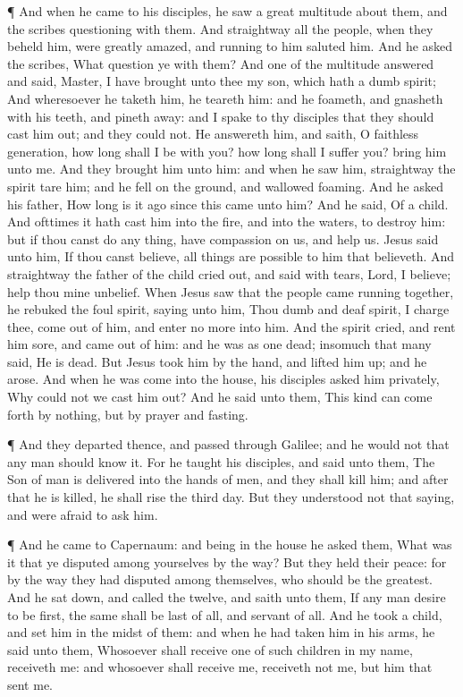  ¶ And when he came to his disciples, he saw a great
multitude about them, and the scribes questioning with them.
 And straightway all the people, when they beheld him, were
greatly amazed, and running to him saluted him.  And he
asked the scribes, What question ye with them?  And one of
the multitude answered and said, Master, I have brought unto thee my
son, which hath a dumb spirit;  And wheresoever he taketh
him, he teareth him: and he foameth, and gnasheth with his teeth, and
pineth away: and I spake to thy disciples that they should cast him out;
and they could not.  He answereth him, and saith, O
faithless generation, how long shall I be with you? how long shall I
suffer you? bring him unto me.  And they brought him unto
him: and when he saw him, straightway the spirit tare him; and he fell
on the ground, and wallowed foaming.  And he asked his
father, How long is it ago since this came unto him? And he said, Of a
child.  And ofttimes it hath cast him into the fire, and
into the waters, to destroy him: but if thou canst do any thing, have
compassion on us, and help us.  Jesus said unto him, If
thou canst believe, all things are possible to him that believeth.
 And straightway the father of the child cried out, and
said with tears, Lord, I believe; help thou mine unbelief. 
When Jesus saw that the people came running together, he rebuked the
foul spirit, saying unto him, Thou dumb and deaf spirit, I charge thee,
come out of him, and enter no more into him.  And the
spirit cried, and rent him sore, and came out of him: and he was as one
dead; insomuch that many said, He is dead.  But Jesus took
him by the hand, and lifted him up; and he arose.  And when
he was come into the house, his disciples asked him privately, Why could
not we cast him out?  And he said unto them, This kind can
come forth by nothing, but by prayer and fasting.

 ¶ And they departed thence, and passed through Galilee;
and he would not that any man should know it.  For he
taught his disciples, and said unto them, The Son of man is delivered
into the hands of men, and they shall kill him; and after that he is
killed, he shall rise the third day.  But they understood
not that saying, and were afraid to ask him.

 ¶ And he came to Capernaum: and being in the house he
asked them, What was it that ye disputed among yourselves by the way?
 But they held their peace: for by the way they had
disputed among themselves, who should be the greatest.  And
he sat down, and called the twelve, and saith unto them, If any man
desire to be first, the same shall be last of all, and servant of all.
 And he took a child, and set him in the midst of them: and
when he had taken him in his arms, he said unto them, 
Whosoever shall receive one of such children in my name, receiveth me:
and whosoever shall receive me, receiveth not me, but him that sent me.

